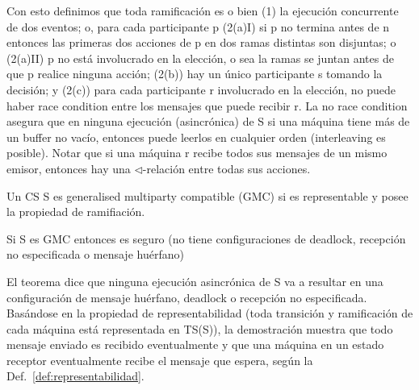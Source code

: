 Con esto definimos que toda ramificación es o bien (1) la ejecución concurrente de dos eventos; o, para cada participante p (2(a)I) si p no termina antes de n entonces las primeras dos acciones de p en dos ramas distintas son disjuntas; o (2(a)II) p no está involucrado en la elección, o sea la ramas se juntan antes de que p realice ninguna acción; (2(b)) hay un único participante s tomando la decisión; y (2(c)) para cada participante r involucrado en la elección, no puede haber race condition entre los mensajes que puede recibir r. La no race condition asegura que en ninguna ejecución (asincrónica) de S si una máquina tiene más de un buffer no vacío, entonces puede leerlos en cualquier orden (interleaving es posible). Notar que si una máquina r recibe todos sus mensajes de un mismo emisor, entonces hay una $\triangleleft$-relación entre todas sus acciones.

\begin{definition} Un CS S es generalised multiparty compatible (GMC) si es representable y posee la propiedad de ramifiación. 
\end{definition}

\begin{theorem}[Solvencia]Si S es GMC entonces es seguro (no tiene configuraciones de deadlock, recepción no especificada o mensaje huérfano)
\end{theorem}

El teorema dice que ninguna ejecución asincrónica de S va a resultar en una configuración de mensaje huérfano, deadlock o recepción no especificada. Basándose en la propiedad de representabilidad (toda transición y ramificación de cada máquina está representada en TS(S)), la demostración \cite{lange:popl15} muestra que todo mensaje enviado es recibido eventualmente y que una máquina en un estado receptor eventualmente recibe el mensaje que espera, según la Def.~\ref{def:representabilidad}.

